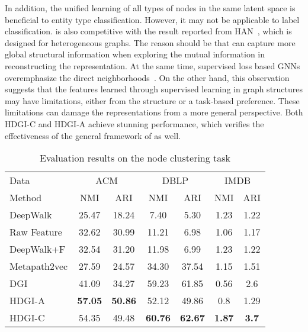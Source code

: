 \documentclass[conference]{IEEEtran}
\begin{document}
	In addition, the unified learning of all types of nodes in the same latent space is beneficial to entity type classification. However, it may not be applicable to label classification. {\our} is also competitive with the result reported from HAN~\cite{WJSWCYY19}, which is designed for heterogeneous graphs. The reason should be that {\our} can capture more global structural information when exploring the mutual information in reconstructing the representation. At the same time, supervised loss based GNNs overemphasize the direct neighborhoods~\cite{velivckovic2018deep}. On the other hand, this observation suggests that the features learned through supervised learning in graph structures may have limitations, either from the structure or a task-based preference. These limitations can damage the representations from a more general perspective. 
	Both HDGI-C and HDGI-A achieve stunning performance, which verifies the effectiveness of the general framework of {\our} as well.
\begin{table}
\centering
\caption{Evaluation results on the node clustering task}
\begin{tabular}{l| c| c| c| c| c| c}
			\toprule
			Data & \multicolumn{2}{c|}{ACM} & \multicolumn{2}{c|}{DBLP} & \multicolumn{2}{c}{IMDB}\\
			\cmidrule(l){1-7}
			Method & NMI & ARI & NMI & ARI & NMI & ARI \\
			\cmidrule(l){1-7}
			DeepWalk    &25.47  & 18.24 & 7.40  & 5.30 & 1.23 & 1.22 \\
			Raw Feature &32.62  & 30.99 & 11.21 & 6.98 & 1.06 & 1.17 \\
			DeepWalk+F  &32.54  & 31.20 & 11.98 & 6.99 & 1.23 & 1.22 \\
			Metapath2vec&27.59  & 24.57 & 34.30 & 37.54 & 1.15 & 1.51 \\
			DGI         &41.09  & 34.27 & 59.23 & 61.85 & 0.56 & 2.6 \\
			\cmidrule(l){1-7}
			HDGI-A      &\textbf{57.05} & \textbf{50.86} & 52.12 & 49.86 & 0.8 & 1.29 \\
			HDGI-C      & 54.35 & 49.48 & \textbf{60.76} & \textbf{62.67} & \textbf{1.87} & \textbf{3.7} \\
			\bottomrule
		\end{tabular}
		\label{tab:results_Rossmann}
\end{table}
\end{document}
